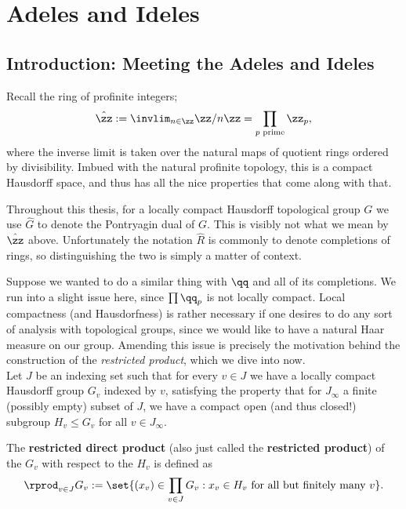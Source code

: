 \documentclass[11pt, x11names, openany]{book}
\begin{document}
\newpage
\section{Adeles and Ideles}
\label{section: Adeles&Ideles}

\subsection{Introduction: Meeting the Adeles and Ideles}
\label{subsection: Intro Adeles and Ideles}

Recall the ring of profinite integers; 
\begin{equation*}
    \hat{\zz} := \invlim_{n \in \zz} \zz/n\zz = \prod_{p \text{ prime}} \zz_p,
\end{equation*}
where the inverse limit is taken over the natural maps of quotient rings ordered by divisibility. Imbued with the natural profinite topology, this is a compact Hausdorff space, and thus has all the nice properties that come along with that. 

\begin{warning}
Throughout this thesis, for a locally compact Hausdorff topological group $G$ we use $\hat{G}$ to denote the Pontryagin dual of $G$. This is visibly not what we mean by $\hat{\zz}$ above. Unfortunately the notation $\hat{R}$ is commonly to denote completions of rings, so distinguishing the two is simply a matter of context.
\end{warning}

Suppose we wanted to do a similar thing with $\qq$ and all of its completions. We run into a slight issue here, since $\prod \qq_p$ is not locally compact. Local compactness (and Hausdorfness) is rather necessary if one desires to do any sort of analysis with topological groups, since we would like to have a natural Haar measure on our group. Amending this issue is precisely the motivation behind the construction of the \textit{restricted product}, which we dive into now.\\


Let $J$ be an indexing set such that for every $v \in J$ we have a locally compact Hausdorff group $G_v$ indexed by $v$, satisfying the property that for $J_\infty$ a finite (possibly empty) subset of $J$, we have a compact open (and thus closed!) subgroup $H_v \leq G_v$ for all $v \in J_\infty$.

\begin{defn}
\label{def: resprod}
The \textbf{restricted direct product} (also just called the \textbf{restricted product}) of the $G_v$ with respect to the $H_v$ is defined as 
\begin{equation*}
    \rprod_{v \in J} G_v := \set{(x_v) \in \prod_{v \in J} G_v : x_v \in H_v \text{ for all but finitely many } v}.
\end{equation*}
\end{defn}
\end{document}
